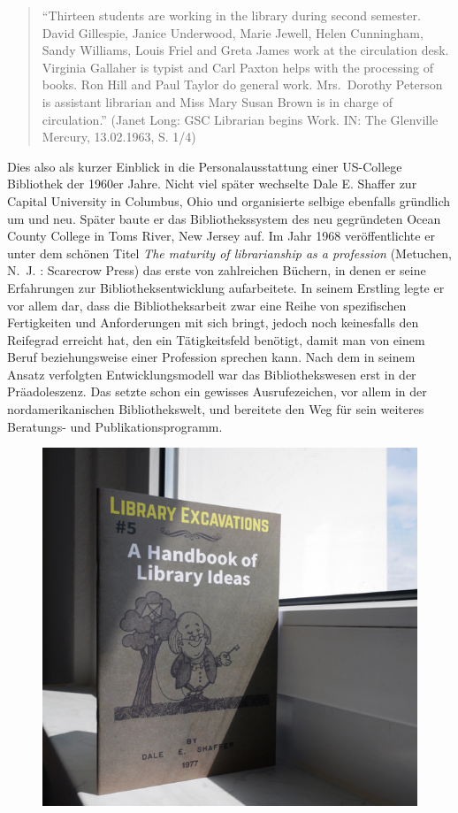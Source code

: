 \documentclass[a4paper,
fontsize=11pt,
oneside,
numbers=noperiodatend,
parskip=half-,
bibliography=totoc,
final
]{scrartcl}
\begin{document}
\begin{quote}
\enquote{Thirteen students are working in the library during second
semester. David Gillespie, Janice Underwood, Marie Jewell, Helen
Cunningham, Sandy Williams, Louis Friel and Greta James work at the
circulation desk. Virginia Gallaher is typist and Carl Paxton helps with
the processing of books. Ron Hill and Paul Taylor do general work.
Mrs.~Dorothy Peterson is assistant librarian and Miss Mary Susan Brown
is in charge of circulation.} (Janet Long: GSC Librarian begins Work.
IN: The Glenville Mercury, 13.02.1963, S. 1/4)
\end{quote}

Dies also als kurzer Einblick in die Personalausstattung einer
US-College Bibliothek der 1960er Jahre. Nicht viel später wechselte Dale
E. Shaffer zur Capital University in Columbus, Ohio und organisierte
selbige ebenfalls gründlich um und neu. Später baute er das
Bibliothekssystem des neu gegründeten Ocean County College in Toms
River, New Jersey auf. Im Jahr 1968 veröffentlichte er unter dem schönen
Titel \emph{The maturity of librarianship as a profession} (Metuchen,
N.~J. : Scarecrow Press) das erste von zahlreichen Büchern, in denen er
seine Erfahrungen zur Bibliotheksentwicklung aufarbeitete. In seinem
Erstling legte er vor allem dar, dass die Bibliotheksarbeit zwar eine
Reihe von spezifischen Fertigkeiten und Anforderungen mit sich bringt,
jedoch noch keinesfalls den Reifegrad erreicht hat, den ein
Tätigkeitsfeld benötigt, damit man von einem Beruf beziehungsweise einer
Profession sprechen kann. Nach dem in seinem Ansatz verfolgten
Entwicklungsmodell war das Bibliothekswesen erst in der Präadoleszenz.
Das setzte schon ein gewisses Ausrufezeichen, vor allem in der
nordamerikanischen Bibliothekswelt, und bereitete den Weg für sein
weiteres Beratungs- und Publikationsprogramm.

\begin{figure}
\centering
\includegraphics{lib_excavations.png}
\end{figure}
\end{document}
